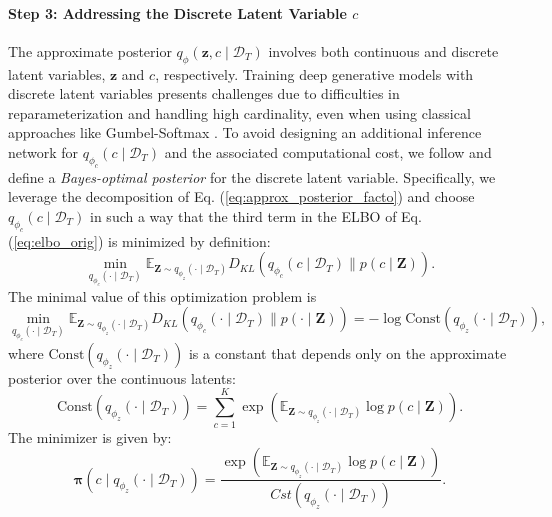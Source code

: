 \documentclass[10pt]{article} %
\begin{document}
\paragraph{Step 3: Addressing the Discrete Latent Variable \(c\)}  
The approximate posterior \(q_{\phi}(\mathbf{z}, c \mid \mathcal{D}_T)\) involves both continuous and discrete latent variables, \(\mathbf{z}\) and \(c\), respectively. Training deep generative models with discrete latent variables presents challenges due to difficulties in reparameterization and handling high cardinality, even when using classical approaches like Gumbel-Softmax \citep{jang2016categorical, tucker2017rebar, huijben2022review}. To avoid designing an additional inference network for \(q_{\phi_c}(c \mid \mathcal{D}_T)\) and the associated computational cost, we follow \citet{Vade, falck2021multi} and define a \emph{Bayes-optimal posterior} for the discrete latent variable. Specifically, we leverage the decomposition of Eq. (\ref{eq:approx_posterior_facto}) and choose \(q_{\phi_c}(c \mid \mathcal{D}_T)\) in such a way that the third term in the ELBO of Eq. (\ref{eq:elbo_orig}) is minimized by definition:
\begin{equation}
\label{eq:opt_problem_VaDE}
\min_{q_{\phi_c}(\cdot \mid \mathcal{D}_T)} \mathbb{E}_{\mathbf{Z} \sim q_{\phi_z}(\cdot \mid \mathcal{D}_T)} D_{KL}(q_{\phi_c}(c \mid \mathcal{D}_T) \parallel p(c \mid \mathbf{Z})).
\end{equation}
The minimal value of this optimization problem is
\begin{equation}
    \min_{q_{\phi_c}(\cdot \mid \mathcal{D}_T)} \mathbb{E}_{\mathbf{Z} \sim q_{\phi_z}(\cdot \mid \mathcal{D}_T)} D_{KL}(q_{\phi_c}(\cdot \mid \mathcal{D}_T) \parallel p(\cdot \mid \mathbf{Z})) = -\log \mathrm{Const}(q_{\phi_z}(\cdot \mid \mathcal{D}_T)), 
\end{equation}
where \(\mathrm{Const}(q_{\phi_z}(\cdot \mid \mathcal{D}_T))\) is a constant that depends only on the approximate posterior over the continuous latents: 
\[
\mathrm{Const}(q_{\phi_z}(\cdot \mid \mathcal{D}_T)) = \sum_{c=1}^K \exp(\mathbb{E}_{\mathbf{Z} \sim q_{\phi_z}(\cdot \mid \mathcal{D}_T)} \log p(c \mid \mathbf{Z})).
\]
The minimizer is given by:
\begin{equation}
\label{eq:bayes_opt_posterior}
    \mathbf{\pi}(c \mid q_{\phi_z}(\cdot \mid \mathcal{D}_T)) = \frac{\exp(\mathbb{E}_{\mathbf{Z} \sim q_{\phi_z}(\cdot \mid \mathcal{D}_T)} \log p(c \mid \mathbf{Z}))}{Cst(q_{\phi_z}(\cdot \mid \mathcal{D}_T))}.
\end{equation}
\end{document}
